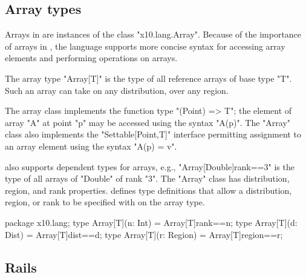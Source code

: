 \subsection{Array types}
\label{ArrayTypeConstructors}

Arrays in \Xten{} are instances of the class
\xcd"x10.lang.Array".
Because of the importance of arrays in \Xten{}, the language
supports more concise syntax for accessing array elements and
performing operations on arrays.


The array type \xcd"Array[T]" is the type of all
reference arrays of base type \xcd"T". Such an array can take on any
distribution, over any region. 


The array class implements the function type
\xcd"(Point) => T"; the element of array \xcd"A" at point
\xcd"p" may be accessed using the 
syntax \xcd"A(p)".  The \xcd"Array" class 
also implements the \xcd"Settable[Point,T]" interface 
permitting assignment to an array element using the syntax
\xcd"A(p) = v".

\Xten{} also supports dependent types for arrays,
e.g.,
\xcd"Array[Double]{rank==3}" is the type of all arrays of 
\xcd"Double" of rank \xcd"3".
The \xcd"Array" class has distribution, region, and rank
properties. 
\XtenCurrVer{} defines type definitions that allow a distribution,
region, or rank to be specified with on the array type.

\begin{xten}
package x10.lang;
type Array[T](n: Int) = Array[T]{rank==n};
type Array[T](d: Dist) = Array[T]{dist==d};
type Array[T](r: Region) = Array[T]{region==r};
\end{xten}

\subsection{Rails}

